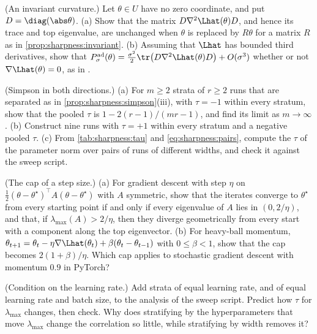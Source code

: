 \begin{refsection}
\begin{exercises}
\item \consolidation (An invariant curvature.) Let $\theta\in U$ have no zero coordinate, and put $D=\diag(\abs\theta)$. (a) Show that the matrix $D\nabla^2\Lhat(\theta)D$, and hence its trace and top eigenvalue, are unchanged when $\theta$ is replaced by $R\theta$ for a matrix $R$ as in \cref{prop:sharpness:invariant}. (b) Assuming that $\Lhat$ has bounded third derivatives, show that $P^{\mathrm{ad}}_\sigma(\theta)=\frac{\sigma^2}2\tr\bigl(D\nabla^2\Lhat(\theta)D\bigr)+O(\sigma^3)$ whether or not $\nabla\Lhat(\theta)=0$, as in \textcite{AndriushchenkoEtAl2023}.\label{ex:sharpness:adaptive}

\item \consolidation (Simpson in both directions.) (a) For $m\ge2$ strata of $r\ge2$ runs that are separated as in \cref{prop:sharpness:simpson}(iii), with $\tau=-1$ within every stratum, show that the pooled $\tau$ is $1-2(r-1)/(mr-1)$, and find its limit as $m\to\infty$. (b) Construct nine runs with $\tau=+1$ within every stratum and a negative pooled $\tau$. (c) From \cref{tab:sharpness:tau} and \eqref{eq:sharpness:pairs}, compute the $\tau$ of the parameter norm over pairs of runs of different widths, and check it against the sweep script.\label{ex:sharpness:simpson}

\item \consolidation\hard (The cap of a step size.) (a) For gradient descent with step $\eta$ on $\frac12(\theta-\theta^\star)^\top A(\theta-\theta^\star)$ with $A$ symmetric, show that the iterates converge to $\theta^\star$ from every starting point if and only if every eigenvalue of $A$ lies in $(0,2/\eta)$, and that, if $\lambda_{\max}(A)>2/\eta$, then they diverge geometrically from every start with a component along the top eigenvector. (b) For heavy-ball momentum, $\theta_{t+1}=\theta_t-\eta\nabla\Lhat(\theta_t)+\beta(\theta_t-\theta_{t-1})$ with $0\le\beta<1$, show that the cap becomes $2(1+\beta)/\eta$. Which cap applies to stochastic gradient descent with momentum $0.9$ in PyTorch? \label{ex:sharpness:momentum}

\item \labwork (Condition on the learning rate.) Add strata of equal learning rate, and of equal learning rate and batch size, to the analysis of the sweep script. Predict how $\tau$ for $\lambda_{\max}$ changes, then check. Why does stratifying by the hyperparameters that move $\lambda_{\max}$ change the correlation so little, while stratifying by width removes it?\label{ex:sharpness:condition}


\end{exercises}
\end{refsection}
